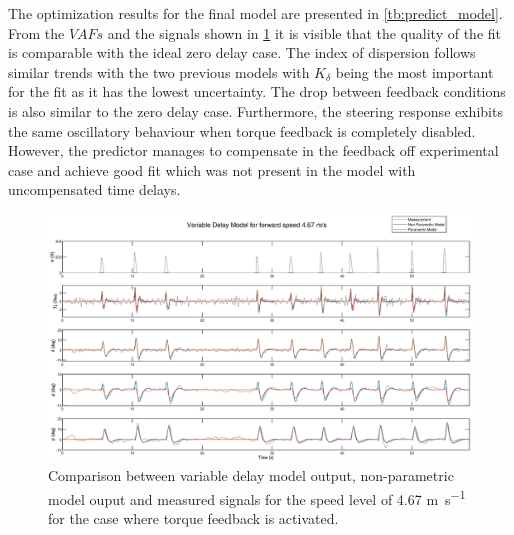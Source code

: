 The optimization results for the final model are presented in \cref{tb:predict_model}. From the \ensuremath{\mathit{VAF}s} and the signals shown in \cref{fig:paper9} it is visible that the quality of the fit is comparable with the ideal zero delay case. The index of dispersion follows similar trends with the two previous models  with \ensuremath{K_\delta} being the most important for the fit as it has the lowest uncertainty. The drop between feedback conditions is also similar to the zero delay case. Furthermore, the steering response exhibits  the same oscillatory behaviour when torque feedback is completely disabled. However, the predictor manages to compensate in the feedback off experimental case and achieve good fit which was not present in the model with uncompensated time delays. 

\begin{figure}[!h]
    \centering
    \captionsetup{justification=centering,margin=2cm}

    \includegraphics[width=\textwidth]{images/predict_delay_result1.eps}
    \caption{Comparison between variable delay model output, non-parametric model ouput and measured signals for the speed level of 4.67 \si{\meter\per\second} for the case where torque feedback is activated.}
    \label{fig:paper9}
\end{figure}


